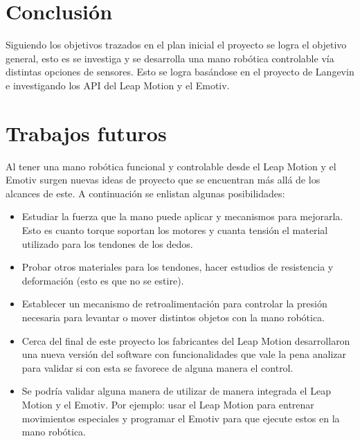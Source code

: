 \documentclass[letterpaper,journal,transmag]{IEEEtran}
\begin{document}
\section{Conclusión}
Siguiendo los objetivos trazados en el plan inicial el proyecto se logra el
objetivo general, esto es se investiga y se desarrolla una mano robótica
controlable vía distintas opciones de sensores. Esto se logra basándose en el
proyecto de Langevin e investigando los API del Leap Motion y el Emotiv. 

\section{Trabajos futuros}
Al tener una mano robótica funcional y controlable desde el Leap Motion y el
Emotiv surgen nuevas ideas de proyecto que se encuentran más allá de los
alcances de este. A continuación se enlistan algunas posibilidades:
\begin{itemize}
 \item Estudiar la fuerza que la mano puede aplicar y mecanismos para
mejorarla. Esto es cuanto torque soportan los motores y cuanta tensión el
material utilizado para los tendones de los dedos.
\item Probar otros materiales para los tendones, hacer estudios de resistencia
y deformación (esto es que no se estire).
\item Establecer un mecanismo de retroalimentación para controlar la presión
necesaria para levantar o mover distintos objetos con la mano robótica.
\item Cerca del final de este proyecto los fabricantes del Leap Motion
desarrollaron una nueva versión del software con funcionalidades que vale la
pena analizar para validar si con esta se favorece de alguna manera el control.
\item Se podría validar alguna manera de utilizar de manera integrada el Leap
Motion y el Emotiv. Por ejemplo: usar el Leap Motion para entrenar movimientos
especiales y programar el Emotiv para que ejecute estos en la mano robótica.
\end{itemize}



\ifCLASSOPTIONcaptionsoff
\newpage
\fi



\end{document}
